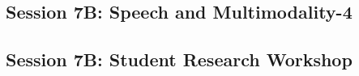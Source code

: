 \subsection{\large Session 7B: Speech and Multimodality-4}
\label{parallel-session-7B-trackH}
\TrackHLoc\hfill\sessionchair{}{}
\clearpage
\subsection{\large Session 7B: Student Research Workshop}
\label{parallel-session-7B-trackI}
\TrackILoc\hfill\sessionchair{}{}
\clearpage



